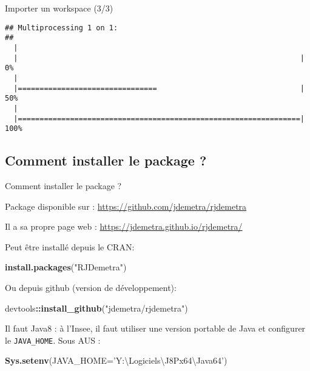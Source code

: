 \documentclass[10pt,xcolor=table,color={dvipsnames,usenames},ignorenonframetext,usepdftitle=false,french]{beamer}
\newenvironment{Shaded}{\begin{snugshade}}{\end{snugshade}}
\newcommand{\DataTypeTok}[1]{\textcolor[rgb]{0.13,0.29,0.53}{#1}}
\newcommand{\KeywordTok}[1]{\textcolor[rgb]{0.13,0.29,0.53}{\textbf{#1}}}
\newcommand{\NormalTok}[1]{#1}
\newcommand{\OperatorTok}[1]{\textcolor[rgb]{0.81,0.36,0.00}{\textbf{#1}}}
\newcommand{\StringTok}[1]{\textcolor[rgb]{0.31,0.60,0.02}{#1}}
\begin{document}
\begin{frame}[fragile]{Importer un workspace (3/3)}
\begin{verbatim}
## Multiprocessing 1 on 1:
## 
  |                                                                       
  |                                                                 |   0%
  |                                                                       
  |================================                                 |  50%
  |                                                                       
  |=================================================================| 100%
\end{verbatim}

\end{frame}

\hypertarget{comment-installer-le-package}{%
\subsection{Comment installer le package
?}\label{comment-installer-le-package}}

\begin{frame}[fragile]{Comment installer le package ?}
\protect\hypertarget{comment-installer-le-package-1}{}

Package disponible sur \large\faGithub\normalsize:
\url{https://github.com/jdemetra/rjdemetra}

Il a sa propre page web : \url{https://jdemetra.github.io/rjdemetra/}

Peut être installé depuis le CRAN:

\begin{Shaded}
\begin{Highlighting}[]
\KeywordTok{install.packages}\NormalTok{(}\StringTok{"RJDemetra"}\NormalTok{)}
\end{Highlighting}
\end{Shaded}

Ou depuis github (version de développement):

\begin{Shaded}
\begin{Highlighting}[]
\NormalTok{devtools}\OperatorTok{::}\KeywordTok{install_github}\NormalTok{(}\StringTok{"jdemetra/rjdemetra"}\NormalTok{)}
\end{Highlighting}
\end{Shaded}

\bcinfo Il faut Java8 : à l'Insee, il faut utiliser une version portable
de Java et configurer le \texttt{JAVA\_HOME}. Sous AUS :

\begin{Shaded}
\begin{Highlighting}[]
\KeywordTok{Sys.setenv}\NormalTok{(}\DataTypeTok{JAVA_HOME=}\StringTok{'Y:\textbackslash{}Logiciels\textbackslash{}J8Px64\textbackslash{}Java64'}\NormalTok{)}
\end{Highlighting}
\end{Shaded}

\end{frame}
\end{document}

